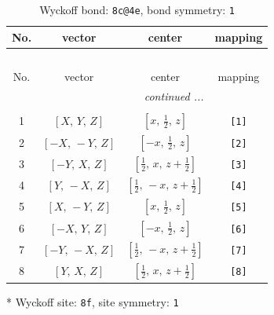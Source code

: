 \documentclass[fleqn,8pt]{jsarticle}
\begin{document}
\renewcommand{\arraystretch}{1.2}
\begin{longtable}{cccc}
\caption{Wyckoff bond: {\tt 8c@4e}, bond symmetry: {\tt 1}}
 \\
 \hline \hline
No. & vector & center & mapping \\ \hline \endfirsthead

\multicolumn{3}{l}{\tablename\ \thetable{}} \\
 \hline \hline
No. & vector & center & mapping \\ \hline \endhead

 \hline \hline
\multicolumn{3}{r}{\footnotesize\it continued ...} \\ \endfoot

 \hline \hline
\multicolumn{3}{r}{} \\ \endlastfoot

1 & $\left[ X,\, Y,\, Z \right]$ & $\left[ x,\, \frac{1}{2},\, z \right]$ & {\tt [1]} \\ \hline
2 & $\left[ - X,\, - Y,\, Z \right]$ & $\left[ - x,\, \frac{1}{2},\, z \right]$ & {\tt [2]} \\ \hline
3 & $\left[ - Y,\, X,\, Z \right]$ & $\left[ \frac{1}{2},\, x,\, z + \frac{1}{2} \right]$ & {\tt [3]} \\ \hline
4 & $\left[ Y,\, - X,\, Z \right]$ & $\left[ \frac{1}{2},\, - x,\, z + \frac{1}{2} \right]$ & {\tt [4]} \\ \hline
5 & $\left[ X,\, - Y,\, Z \right]$ & $\left[ x,\, \frac{1}{2},\, z \right]$ & {\tt [5]} \\ \hline
6 & $\left[ - X,\, Y,\, Z \right]$ & $\left[ - x,\, \frac{1}{2},\, z \right]$ & {\tt [6]} \\ \hline
7 & $\left[ - Y,\, - X,\, Z \right]$ & $\left[ \frac{1}{2},\, - x,\, z + \frac{1}{2} \right]$ & {\tt [7]} \\ \hline
8 & $\left[ Y,\, X,\, Z \right]$ & $\left[ \frac{1}{2},\, x,\, z + \frac{1}{2} \right]$ & {\tt [8]} \\
\end{longtable}
* Wyckoff site: {\tt 8f}, site symmetry: {\tt 1}
\renewcommand{\arraystretch}{1.2}
\end{document}
